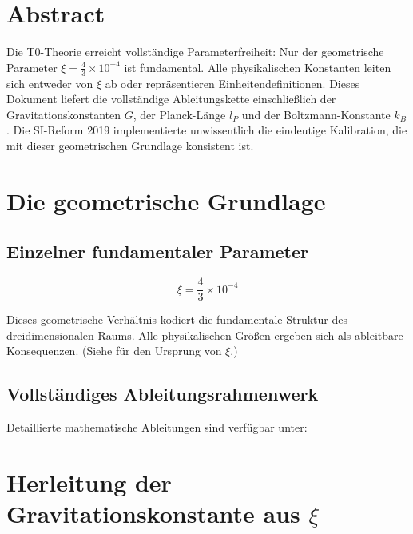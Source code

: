 \section*{Abstract}
		Die T0-Theorie erreicht vollständige Parameterfreiheit: Nur der geometrische Parameter $\xi = \frac{4}{3} \times 10^{-4}$ ist fundamental. Alle physikalischen Konstanten leiten sich entweder von $\xi$ ab oder repräsentieren Einheitendefinitionen. Dieses Dokument liefert die vollständige Ableitungskette einschließlich der Gravitationskonstanten $G$, der Planck-Länge $l_P$ und der Boltzmann-Konstante $k_B$. Die SI-Reform 2019 implementierte unwissentlich die eindeutige Kalibration, die mit dieser geometrischen Grundlage konsistent ist.

	
	
	
	
	\section{Die geometrische Grundlage}
	
	\subsection{Einzelner fundamentaler Parameter}
	
	\begin{equation}
		\boxed{\xi = \frac{4}{3} \times 10^{-4}}
	\end{equation}
	
	Dieses geometrische Verhältnis kodiert die fundamentale Struktur des dreidimensionalen Raums. Alle physikalischen Größen ergeben sich als ableitbare Konsequenzen. (Siehe \cite{T0_xi_ursprung_De} für den Ursprung von $\xi$.)
	
	\subsection{Vollständiges Ableitungsrahmenwerk}
	
	Detaillierte mathematische Ableitungen sind verfügbar unter:
	
	\begin{center}
		
	\end{center}
	
	\section{Herleitung der Gravitationskonstante aus $\xi$}
	
